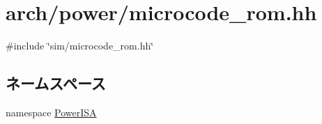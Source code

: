 \hypertarget{arch_2power_2microcode__rom_8hh}{
\section{arch/power/microcode\_\-rom.hh}
\label{arch_2power_2microcode__rom_8hh}
}
{\ttfamily \#include \char`\"{}sim/microcode\_\-rom.hh\char`\"{}}\par
\subsection*{ネームスペース}
\begin{DoxyCompactItemize}
\item 
namespace \hyperlink{namespacePowerISA}{PowerISA}
\end{DoxyCompactItemize}
